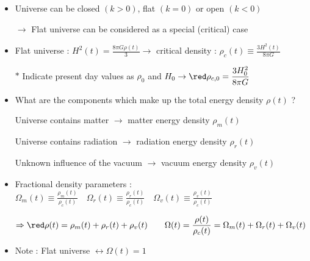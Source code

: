 \onecolumn
\begin{itemize}
\item Universe can be closed $(k>0)$, flat $(k=0)$ or open $(k<0)$
\item[] $\rightarrow$ {\blue Flat universe can be considered as a special (critical) case}
\item Flat universe : $\displaystyle H^{2}(t)=\frac{8\pi G\rho(t)}{3} \rightarrow$
      {\blue critical density : $\displaystyle \rho_{c}(t) \equiv \frac{3H^{2}(t)}{8\pi G}$}
\item[$\ast$] Indicate present day values as $\rho_{0}$ and $H_{0} \rightarrow
      \displaystyle {\red \rho_{c,0}=\frac{3H_{0}^{2}}{8\pi G}}$
\item {\blue What are the components which make up the total energy density $\rho(t)$ ?}
\item[] Universe contains {\red matter} $\rightarrow$ {\red matter energy density $\rho_{m}(t)$}
\item[] Universe contains {\red radiation} $\rightarrow$ {\red radiation energy density $\rho_{r}(t)$}
\item[] Unknown {\red influence of the vacuum} $\rightarrow$ {\red vacuum energy density $\rho_{v}(t)$}
\item {\blue Fractional density parameters : $\displaystyle
       \Omega_{m}(t) \equiv \frac{\rho_{m}(t)}{\rho_{c}(t)} \quad
       \Omega_{r}(t) \equiv \frac{\rho_{r}(t)}{\rho_{c}(t)} \quad
       \Omega_{v}(t) \equiv \frac{\rho_{v}(t)}{\rho_{c}(t)}$}
\item[] $\displaystyle \Rightarrow {\red \rho(t)=\rho_{m}(t)+\rho_{r}(t)+\rho_{v}(t) \qquad
         \Omega(t)=\frac{\rho(t)}{\rho_{c}(t)}=\Omega_{m}(t)+\Omega_{r}(t)+\Omega_{v}(t)}$
\item Note : {\blue Flat universe $\leftrightarrow \Omega(t)=1$}
\end{itemize}

